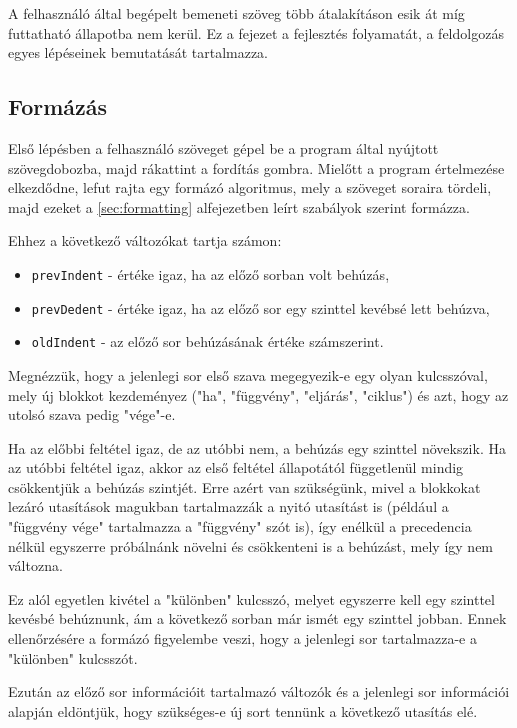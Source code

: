 A felhasználó által begépelt bemeneti szöveg több átalakításon esik át míg futtatható állapotba nem kerül. Ez a fejezet a fejlesztés folyamatát, a feldolgozás egyes lépéseinek bemutatását tartalmazza.

\subsection{Formázás}

Első lépésben a felhasználó szöveget gépel be a program által nyújtott szövegdobozba, majd rákattint a fordítás gombra. Mielőtt a program értelmezése elkezdődne, lefut rajta egy formázó algoritmus, mely a szöveget soraira tördeli, majd ezeket a \ref{sec:formatting} alfejezetben leírt szabályok szerint formázza.

Ehhez a következő változókat tartja számon:

\begin{itemize}
    \item \texttt{prevIndent} - értéke igaz, ha az előző sorban volt behúzás,
    \item \texttt{prevDedent} - értéke igaz, ha az előző sor egy szinttel kevébsé lett behúzva,
    \item \texttt{oldIndent} - az előző sor behúzásának értéke számszerint.
\end{itemize}

Megnézzük, hogy a jelenlegi sor első szava megegyezik-e egy olyan kulcsszóval, mely új blokkot kezdeményez ("ha", "függvény", "eljárás", "ciklus") és azt, hogy az utolsó szava pedig "vége"-e.

Ha az előbbi feltétel igaz, de az utóbbi nem, a behúzás egy szinttel növekszik. Ha az utóbbi feltétel igaz, akkor az első feltétel állapotától függetlenül mindig csökkentjük a behúzás szintjét. Erre azért van szükségünk, mivel a blokkokat lezáró utasítások magukban tartalmazzák a nyitó utasítást is (például a "függvény vége" tartalmazza a "függvény" szót is), így enélkül a precedencia nélkül egyszerre próbálnánk növelni és csökkenteni is a behúzást, mely így nem változna.

Ez alól egyetlen kivétel a "különben" kulcsszó, melyet egyszerre kell egy szinttel kevésbé behúznunk, ám a következő sorban már ismét egy szinttel jobban. Ennek ellenőrzésére a formázó figyelembe veszi, hogy a jelenlegi sor tartalmazza-e a "különben" kulcsszót.

Ezután az előző sor információit tartalmazó változók és a jelenlegi sor információi alapján eldöntjük, hogy szükséges-e új sort tennünk a következő utasítás elé.

